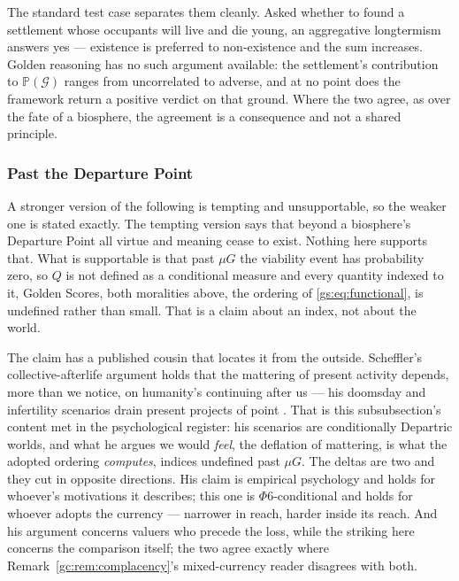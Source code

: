\documentclass[11pt]{article}
\numberwithin{equation}{section}
\theoremstyle{plain}
\theoremstyle{definition}
\theoremstyle{remark}
\newcommand{\PP}{\mathbb{P}}
\begin{document}
The standard test case separates them cleanly. Asked whether to found a
settlement whose occupants will live and die young, an aggregative
longtermism answers yes --- existence is preferred to non-existence and
the sum increases. Golden reasoning has no such argument available: the
settlement's contribution to $\PP(\mathcal G)$ ranges from uncorrelated
to adverse, and at no point does the framework return a positive verdict
on that ground. Where the two agree, as over the fate of a biosphere,
the agreement is a consequence and not a shared principle.

\subsubsection{Past the Departure Point}\label{gs:ssub:departric}

A stronger version of the following is tempting and unsupportable, so the
weaker one is stated exactly. The tempting version says that beyond a biosphere's Departure Point all
virtue and meaning cease to exist. Nothing here supports that. What is
supportable is that past $\mu G$ the viability event has probability
zero, so $Q$ is not defined as a conditional measure and every quantity
indexed to it, Golden Scores, both moralities above, the ordering of
\eqref{gs:eq:functional}, is undefined rather than small. That is a
claim about an index, not about the world.

The claim has a published cousin that locates it from the outside.
Scheffler's collective-afterlife argument holds that the mattering of
present activity depends, more than we notice, on humanity's continuing
after us --- his doomsday and infertility scenarios drain present
projects of point \cite{Scheffler13}. That is this subsubsection's
content met in the psychological register: his scenarios are
conditionally Departric worlds, and what he argues we would \emph{feel}, the deflation of mattering, is what the adopted ordering
\emph{computes}, indices undefined past $\mu G$. The deltas are two
and they cut in opposite directions. His claim is empirical psychology
and holds for whoever's motivations it describes; this one is
$\Phi6$-conditional and holds for whoever adopts the currency ---
narrower in reach, harder inside its reach. And his argument concerns
valuers who precede the loss, while the striking here concerns the
comparison itself; the two agree exactly where
Remark~\ref{gc:rem:complacency}'s mixed-currency reader disagrees with
both.
\end{document}
